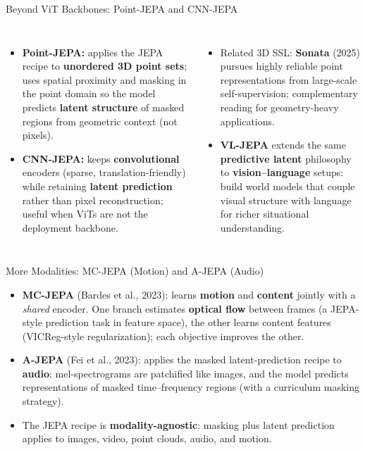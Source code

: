 \begin{frame}{Beyond ViT Backbones: Point-JEPA and CNN-JEPA}
  \begin{columns}[T,onlytextwidth]
    \begin{itemize}\itemsep0.32em
      \item[\textcolor{red}{$\blacktriangleright$}] \textbf{Point-JEPA:} applies the JEPA recipe to \textbf{unordered 3D point sets}; uses spatial proximity and masking in the point domain so the model predicts \textbf{latent structure} of masked regions from geometric context (not pixels).
      \item[\textcolor{red}{$\blacktriangleright$}] \textbf{CNN-JEPA:} keeps \textbf{convolutional} encoders (sparse, translation-friendly) while retaining \textbf{latent prediction} rather than pixel reconstruction; useful when ViTs are not the deployment backbone.
    \end{itemize}
    \begin{itemize}\itemsep0.32em
      \item[\textcolor{red}{$\blacktriangleright$}] Related 3D SSL: \textbf{Sonata} (2025) pursues highly reliable point representations from large-scale self-supervision; complementary reading for geometry-heavy applications.
      \item[\textcolor{red}{$\blacktriangleright$}] \textbf{VL-JEPA} extends the same \textbf{predictive latent} philosophy to \textbf{vision--language} setups: build world models that couple visual structure with language for richer situational understanding.
    \end{itemize}
  \end{columns}
\end{frame}

\begin{frame}{More Modalities: MC-JEPA (Motion) and A-JEPA (Audio)}
  \begin{itemize}\itemsep0.32em
    \item[\textcolor{red}{$\blacktriangleright$}] \textbf{MC-JEPA} (Bardes et al., 2023): learns \textbf{motion} and \textbf{content} jointly with a \emph{shared} encoder. One branch estimates \textbf{optical flow} between frames (a JEPA-style prediction task in feature space), the other learns content features (VICReg-style regularization); each objective improves the other.
    \item[\textcolor{red}{$\blacktriangleright$}] \textbf{A-JEPA} (Fei et al., 2023): applies the masked latent-prediction recipe to \textbf{audio}: mel-spectrograms are patchified like images, and the model predicts representations of masked time--frequency regions (with a curriculum masking strategy).
    \item[\textcolor{red}{$\blacktriangleright$}] The JEPA recipe is \textbf{modality-agnostic}: masking plus latent prediction applies to images, video, point clouds, audio, and motion.
  \end{itemize}
\end{frame}


